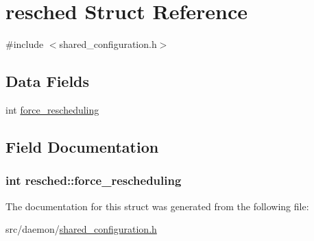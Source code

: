 \hypertarget{structresched}{}\section{resched Struct Reference}
\label{structresched}


{\ttfamily \#include $<$shared\+\_\+configuration.\+h$>$}

\subsection*{Data Fields}
\begin{DoxyCompactItemize}
\item 
int \hyperlink{structresched_a0c832dbecc3f492eca588ca547226fdb}{force\+\_\+rescheduling}
\end{DoxyCompactItemize}


\subsection{Field Documentation}
\subsubsection[{\texorpdfstring{force\+\_\+rescheduling}{force_rescheduling}}]{\setlength{\rightskip}{0pt plus 5cm}int resched\+::force\+\_\+rescheduling}\hypertarget{structresched_a0c832dbecc3f492eca588ca547226fdb}{}\label{structresched_a0c832dbecc3f492eca588ca547226fdb}


The documentation for this struct was generated from the following file\+:\begin{DoxyCompactItemize}
\item 
src/daemon/\hyperlink{shared__configuration_8h}{shared\+\_\+configuration.\+h}\end{DoxyCompactItemize}
